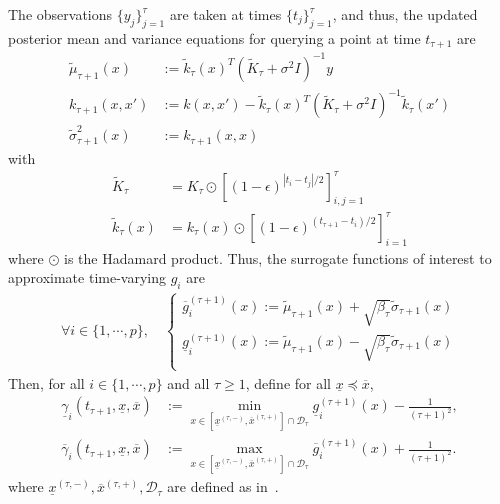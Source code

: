 \documentclass{IEEEojcsys}
\newcommand{\ul}{\underline}
\newcommand{\ol}{\overline}
\begin{document}
The observations $\{y_j\}_{j=1}^\tau$ are taken at times $\{t_j\}_{j=1}^\tau$, and thus, the updated posterior mean and variance equations for querying a point at time $t_{\tau + 1}$ are
\begin{align}
    \widetilde{\mu}_{\tau+1}(x) &:= \widetilde{k}_\tau(x)^T(\widetilde{K}_\tau+\sigma^2 I)^{-1}y \label{eq:tvmean}\\
    k_{\tau+1}(x,x') &:= k(x,x')-\widetilde{k}_\tau(x)^T(\widetilde{K}_\tau+\sigma^2 I)^{-1}\widetilde{k}_\tau(x')\\
    \widetilde{\sigma}_{\tau+1}^2(x) &:= k_{\tau+1}(x,x) \label{eq:tvsig}
\end{align}
with
\begin{align}
    \widetilde{K}_\tau &= K_\tau \odot [(1 - \epsilon)^{|t_i - t_j|/2}]_{i,j=1}^\tau \\
    \widetilde{k}_\tau(x) &= k_\tau(x) \odot [(1-\epsilon)^{(t_{\tau+1} - t_i)/2}]_{i=1}^\tau
\end{align}
where $\odot$ is the Hadamard product. Thus, the surrogate functions of interest to approximate time-varying $g_i$ are 
\begin{align}
    \forall i\in\{1,\cdots,p\}, \quad
    \begin{cases}
    \ol{g}_{i}^{(\tau + 1)}(x) := \widetilde{\mu}_{\tau+1}(x) + \sqrt{\beta_\tau}\widetilde{\sigma}_{\tau+1}(x)\\
    \ul{g}_i^{(\tau + 1)}(x) := \widetilde{\mu}_{\tau+1}(x) - \sqrt{\beta_\tau}\widetilde{\sigma}_{\tau+1}(x)\\
    \end{cases}\label{eq:TVGP-UCB}
\end{align}
Then, for all $i\in\{1,\cdots,p\}$ and all $\tau\geq 1$, define for all $\underline{x}\preceq \overline{x}$,
\begin{align}
\underline{\gamma}_i(t_{\tau + 1}, \underline{x},\overline{x}) &:= \min_{x\in[\underline{x}^{(\tau,-)},\overline{x}^{(\tau,+)}]\cap \mathcal{D}_\tau} \underline{g}^{(\tau + 1)}_i(x)-\frac{1}{(\tau+1)^2},\label{eq:surrogate_functions2a}\\
\overline{\gamma}_i(t_{\tau + 1}, \underline{x},\overline{x}) &:= \max_{x\in[\underline{x}^{(\tau,-)},\overline{x}^{(\tau,+)}]\cap \mathcal{D}_\tau} \overline{g}^{(\tau + 1)}_i(x)+\frac{1}{(\tau+1)^2}.
\label{eq:surrogate_functions2b}
\end{align}
where $\underline{x}^{(\tau,-)},\overline{x}^{(\tau,+)}, \mathcal{D}_\tau$ are defined as in~\cite[Equations 54-55]{caoMMGPOJCSYS}.
\end{document}
